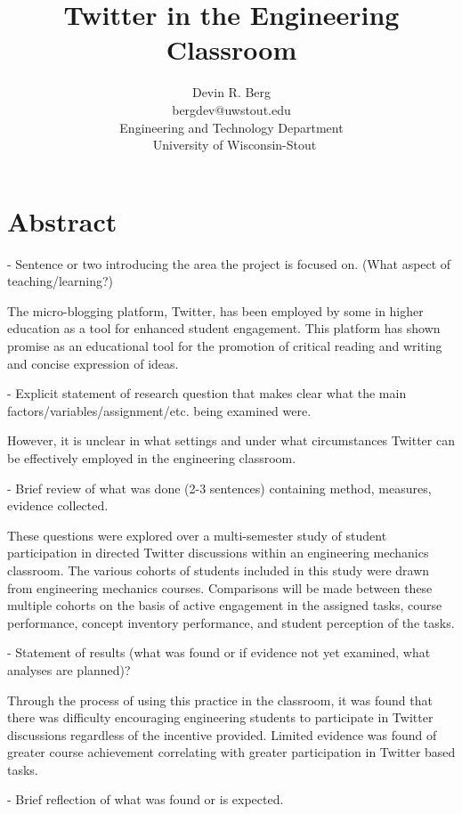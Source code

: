\documentclass[12pt]{article}
\title{\large \textbf{Twitter in the Engineering Classroom}} %
\author{\vspace{-5ex}}
\author{\normalsize Devin R. Berg\\
\normalsize bergdev@uwstout.edu\\
\normalsize Engineering and Technology Department\\\
\normalsize University of Wisconsin-Stout}
\date{\vspace{-5ex}} %
\begin{document}
\raggedright
\maketitle
\thispagestyle{empty}
\pagestyle{empty}

\section*{Abstract}
- Sentence or two introducing the area the project is focused on. (What aspect of teaching/learning?)

The micro-blogging platform, Twitter, has been employed by some in higher education as a tool for enhanced student engagement. This platform has shown promise as an educational tool for the promotion of critical reading and writing and concise expression of ideas.

- Explicit statement of research question that makes clear what the main factors/variables/assignment/etc. being examined were.

However, it is unclear in what settings and under what circumstances Twitter can be effectively employed in the engineering classroom.

- Brief review of what was done (2-3 sentences) containing method, measures, evidence collected.

These questions were explored over a multi-semester study of student participation in directed Twitter discussions within an engineering mechanics classroom. The various cohorts of students included in this study were drawn from engineering mechanics courses. Comparisons will be made between these multiple cohorts on the basis of active engagement in the assigned tasks, course performance, concept inventory performance, and student perception of the tasks.

- Statement of results (what was found or if evidence not yet examined, what analyses are planned)?

Through the process of using this practice in the classroom, it was found that there was difficulty encouraging engineering students to participate in Twitter discussions regardless of the incentive provided. Limited evidence was found of greater course achievement correlating with greater participation in Twitter based tasks.

- Brief reflection of what was found or is expected.
\end{document}
